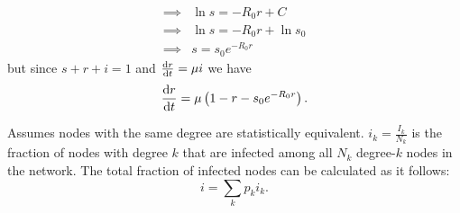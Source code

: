 \documentclass[a4paper,9pt]{extarticle}
\begin{document}
\begin{multicols*}{2}
\begin{align*}
		\implies&\ln s=-R_{0}r+C \\
		\implies&\ln s=-R_{0}r+\ln s_{0}\\
		\implies&s=s_{0}e^{-R_{0}r}
	\end{align*}
	but since $s+r+i=1$ and $\frac{\mathrm{d} r}{\mathrm{d} t}=\mu i$ we have
	\begin{equation*}
		\frac{\mathrm{d} r}{\mathrm{d} t}=\mu\left(1-r-s_{0}e^{-R_{0}r}\right).
	\end{equation*}
	\begin{riquadro}
		Assumes nodes with the same degree are statistically equivalent. $i_{k}=\frac{I_{k}}{N_{k}}$ is the fraction of nodes with degree $k$ that are infected among all $N_{k}$ degree-$k$ nodes in the network. The total fraction of infected nodes can be calculated as it follows:
		\begin{equation*}
			i=\sum_kp_ki_k.
		\end{equation*}
	\end{riquadro}

\end{multicols*}
\end{document}
